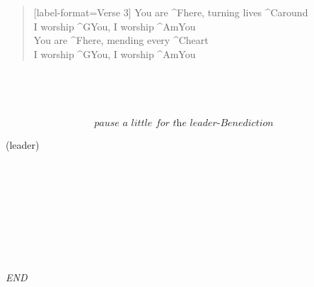 \begin{verse}[label-format={Verse 3}]
  You are ^{F}here, turning lives ^{C}around \\
  I worship ^{G}You, I worship ^{Am}You \\
  You are ^{F}here, mending every ^{C}heart \\
  I worship ^{G}You, I worship ^{Am}You
\end{verse}

\begin{chorus}
  \uqonid{} \\
  \uqonid{}
\end{chorus}

\begin{refrain}
  \ihmfyl{} \\
  \ihmfyl{}
\end{refrain}

\[\textit{pause a little for the leader-Benediction}\]

\begin{bridge}[format={\sffamily \itshape}]
  (leader) \\
  \ldfjft{} \\
  \ldfjft{}
\end{bridge}

\begin{together}
  \ldfjft{} \\
  \ldfjft{}
\end{together}

\begin{chorus}
  \uqonid{} \\
  \uqonid{}
\end{chorus}

\begin{outroo}
  \ihmfyl{} \\
  \ihmfyl{}
\end{outroo}

\begin{acappella}
  \ihmfyl{} \\
  \ihmfyl{}
\end{acappella}

\itshape END


